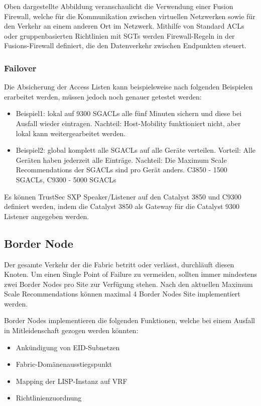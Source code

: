 Oben dargestellte Abbildung veranschaulicht die Verwendung einer Fusion Firewall, welche für die Kommunikation zwischen virtuellen Netzwerken sowie für den Verkehr an einem anderen Ort im Netzwerk. Mithilfe von Standard ACLs oder gruppenbasierten Richtlinien mit SGTs werden Firewall-Regeln in der Fusions-Firewall definiert, die den Datenverkehr zwischen Endpunkten steuert.

\subsubsection{Failover}
Die Absicherung der Access Listen kann beispielsweise nach folgenden Beispielen erarbeitet werden, müssen jedoch noch genauer getestet werden:

\begin{itemize}
	\item Beispiel1: lokal auf 9300 SGACLs alle fünf Minuten sichern und diese bei Ausfall wieder eintragen. Nachteil: Host-Mobility funktioniert nicht, aber lokal kann weitergearbeitet werden.
	\item Beispiel2: global komplett alle SGACLs auf alle Geräte verteilen. Vorteil: Alle Geräten haben jederzeit alle Einträge. Nachteil: Die Maximum Scale Recommendations der SGACLs sind pro Gerät anders. C3850 - 1500 SGACLs, C9300 - 5000 SGACLs
\end{itemize}

Es können TrustSec SXP Speaker/Listener auf den Catalyst 3850 und C9300 definiert werden, indem die Catalyst 3850 als Gateway für die Catalyst 9300 Listener angegeben werden.

\subsection{Border Node}

Der gesamte Verkehr der die Fabric betritt oder verlässt, durchläuft diesen Knoten. Um einen Single Point of Failure zu vermeiden, sollten immer mindestens zwei Border Nodes pro Site zur Verfügung stehen. Nach den aktuellen Maximum Scale Recommendations können maximal 4 Border Nodes Site implementiert werden.

Border Nodes implementieren die folgenden Funktionen, welche bei einem Ausfall in Mitleidenschaft gezogen werden könnten\cite{sda-designguide-sept2018}:
\begin{itemize}
	\item Ankündigung von EID-Subnetzen
	\item Fabric-Domänenausstiegspunkt
	\item Mapping der LISP-Instanz auf VRF
	\item Richtlinienzuordnung
\end{itemize}

